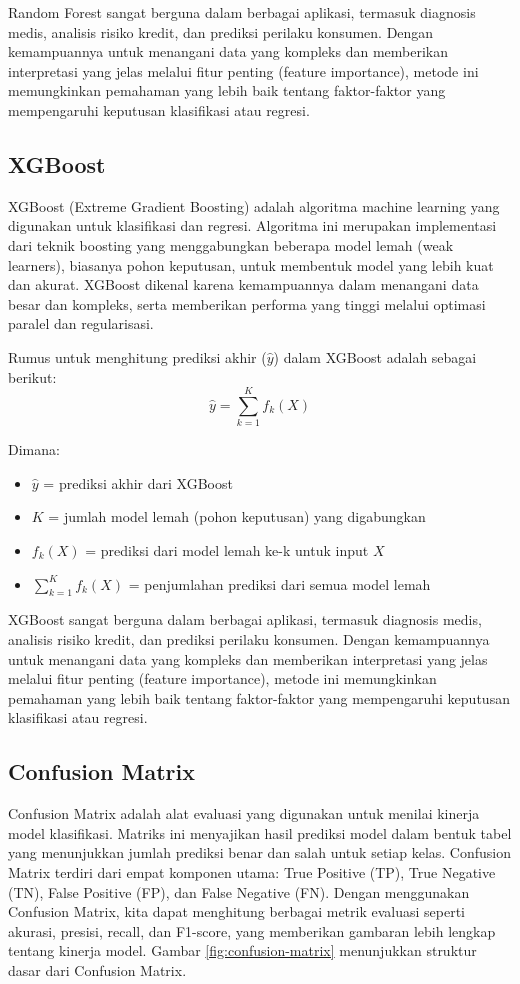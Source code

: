 Random Forest sangat berguna dalam berbagai aplikasi, termasuk diagnosis medis, analisis risiko kredit, dan prediksi perilaku konsumen. Dengan kemampuannya untuk menangani data yang kompleks dan memberikan interpretasi yang jelas melalui fitur penting (feature importance), metode ini memungkinkan pemahaman yang lebih baik tentang faktor-faktor yang mempengaruhi keputusan klasifikasi atau regresi.

\subsection{XGBoost}
XGBoost (Extreme Gradient Boosting) adalah algoritma machine learning yang digunakan untuk klasifikasi dan regresi. Algoritma ini merupakan implementasi dari teknik boosting yang menggabungkan beberapa model lemah (weak learners), biasanya pohon keputusan, untuk membentuk model yang lebih kuat dan akurat. XGBoost dikenal karena kemampuannya dalam menangani data besar dan kompleks, serta memberikan performa yang tinggi melalui optimasi paralel dan regularisasi.

Rumus untuk menghitung prediksi akhir ($\hat{y}$) dalam XGBoost adalah sebagai berikut:
\begin{equation}
    \hat{y} = \sum_{k=1}^{K} f_k(X)
\end{equation}

Dimana:
\begin{itemize}
    \item $\hat{y}$ = prediksi akhir dari XGBoost
    \item $K$ = jumlah model lemah (pohon keputusan) yang digabungkan
    \item $f_k(X)$ = prediksi dari model lemah ke-k untuk input $X$
    \item $\sum_{k=1}^{K} f_k(X)$ = penjumlahan prediksi dari semua model lemah
\end{itemize}

XGBoost sangat berguna dalam berbagai aplikasi, termasuk diagnosis medis, analisis risiko kredit, dan prediksi perilaku konsumen. Dengan kemampuannya untuk menangani data yang kompleks dan memberikan interpretasi yang jelas melalui fitur penting (feature importance), metode ini memungkinkan pemahaman yang lebih baik tentang faktor-faktor yang mempengaruhi keputusan klasifikasi atau regresi.

\subsection{Confusion Matrix}
Confusion Matrix adalah alat evaluasi yang digunakan untuk menilai kinerja model klasifikasi. Matriks ini menyajikan hasil prediksi model dalam bentuk tabel yang menunjukkan jumlah prediksi benar dan salah untuk setiap kelas. Confusion Matrix terdiri dari empat komponen utama: True Positive (TP), True Negative (TN), False Positive (FP), dan False Negative (FN). Dengan menggunakan Confusion Matrix, kita dapat menghitung berbagai metrik evaluasi seperti akurasi, presisi, recall, dan F1-score, yang memberikan gambaran lebih lengkap tentang kinerja model. Gambar \ref{fig:confusion-matrix} menunjukkan struktur dasar dari Confusion Matrix.\parencite{han2012data}

